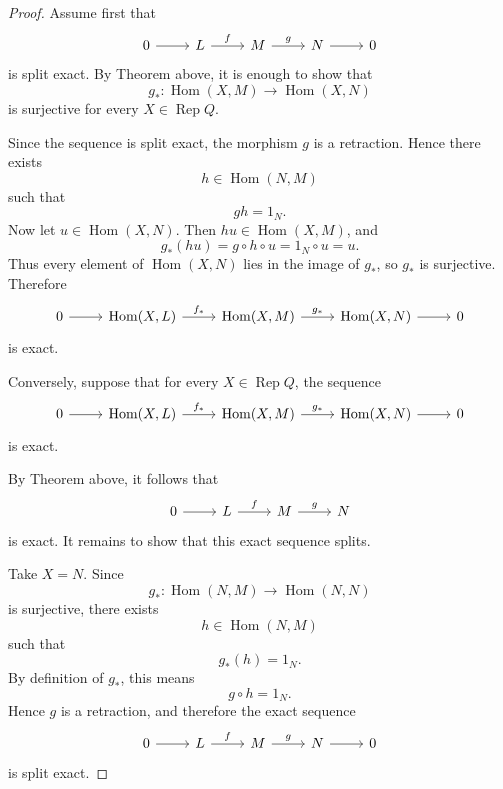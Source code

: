 \documentclass[11pt, a4paper]{report}
\begin{document}
\begin{proof}
    Assume first that
    \[
        \begin{tikzcd}
            0 \arrow[r] & L \arrow[r,"f"] & M \arrow[r,"g"] & N \arrow[r] & 0
        \end{tikzcd}
    \]
    is split exact. By Theorem above, it is enough to show that
    \[
        g_* : \operatorname{Hom}(X,M) \to \operatorname{Hom}(X,N)
    \]
    is surjective for every $X \in \operatorname{Rep}Q$.

    Since the sequence is split exact, the morphism $g$ is a retraction. Hence there exists
    \[
        h \in \operatorname{Hom}(N,M)
    \]
    such that
    \[
        g h = 1_N.
    \]
    Now let $u \in \operatorname{Hom}(X,N)$. Then $h u \in \operatorname{Hom}(X,M)$, and
    \[
        g_*(h u)=g \circ h \circ u = 1_N \circ u = u.
    \]
    Thus every element of $\operatorname{Hom}(X,N)$ lies in the image of $g_*$, so $g_*$ is surjective. Therefore
    \[
        \begin{tikzcd}
            0 \arrow[r] & \operatorname{Hom}(X,L) \arrow[r,"f_*"] &
            \operatorname{Hom}(X,M) \arrow[r,"g_*"] &
            \operatorname{Hom}(X,N) \arrow[r] & 0
        \end{tikzcd}
    \]
    is exact.

    Conversely, suppose that for every $X \in \operatorname{Rep}Q$, the sequence
    \[
        \begin{tikzcd}
            0 \arrow[r] & \operatorname{Hom}(X,L) \arrow[r,"f_*"] &
            \operatorname{Hom}(X,M) \arrow[r,"g_*"] &
            \operatorname{Hom}(X,N) \arrow[r] & 0
        \end{tikzcd}
    \]
    is exact.

    By Theorem above, it follows that
    \[
        \begin{tikzcd}
            0 \arrow[r] & L \arrow[r,"f"] & M \arrow[r,"g"] & N
        \end{tikzcd}
    \]
    is exact. It remains to show that this exact sequence splits.

    Take $X=N$. Since
    \[
        g_* : \operatorname{Hom}(N,M) \to \operatorname{Hom}(N,N)
    \]
    is surjective, there exists
    \[
        h \in \operatorname{Hom}(N,M)
    \]
    such that
    \[
        g_*(h)=1_N.
    \]
    By definition of $g_*$, this means
    \[
        g \circ h = 1_N.
    \]
    Hence $g$ is a retraction, and therefore the exact sequence
    \[
        \begin{tikzcd}
            0 \arrow[r] & L \arrow[r,"f"] & M \arrow[r,"g"] & N \arrow[r] & 0
        \end{tikzcd}
    \]
    is split exact.
\end{proof}
\end{document}
